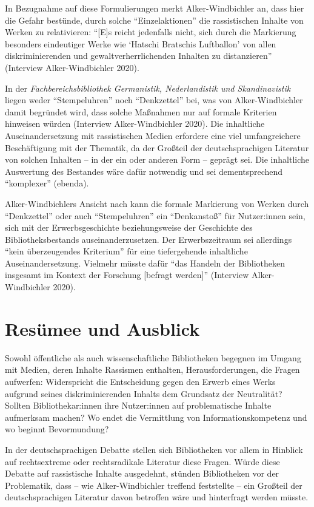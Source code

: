 \documentclass[a4paper,
fontsize=11pt,
oneside,
numbers=noperiodatend,
parskip=half-,
bibliography=totoc,
final
]{scrartcl}
\begin{document}
In Bezugnahme auf diese Formulierungen merkt Alker-Windbichler an, dass
hier die Gefahr bestünde, durch solche \enquote{Einzelaktionen} die
rassistischen Inhalte von Werken zu relativieren: \enquote{[E]s reicht
jedenfalls nicht, sich durch die Markierung besonders eindeutiger Werke
wie `Hatschi Bratschis Luftballon' von allen diskriminierenden und
gewaltverherrlichenden Inhalten zu distanzieren} (Interview
Alker-Windbichler 2020).

In der \emph{Fachbereichsbibliothek Germanistik, Nederlandistik und
Skandinavistik} liegen weder \enquote{Stempeluhren} noch \enquote{Denkzettel} bei,
was von Alker-Windbichler damit begründet wird, dass solche Maßnahmen
nur auf formale Kriterien hinweisen würden (Interview Alker-Windbichler
2020). Die inhaltliche Auseinandersetzung mit rassistischen Medien
erfordere eine viel umfangreichere Beschäftigung mit der Thematik, da
der Großteil der deutschsprachigen Literatur von solchen Inhalten -- in
der ein oder anderen Form -- geprägt sei. Die inhaltliche Auswertung des
Bestandes wäre dafür notwendig und sei dementsprechend \enquote{komplexer}
(ebenda).

Alker-Windbichlers Ansicht nach kann die formale Markierung von Werken
durch \enquote{Denkzettel} oder auch \enquote{Stempeluhren} ein \enquote{Denkanstoß} für
Nutzer:innen sein, sich mit der Erwerbsgeschichte beziehungsweise der
Geschichte des Bibliotheksbestands auseinanderzusetzen. Der
Erwerbszeitraum sei allerdings \enquote{kein überzeugendes Kriterium} für eine
tiefergehende inhaltliche Auseinandersetzung. Vielmehr müsste dafür
\enquote{das Handeln der Bibliotheken insgesamt im Kontext der Forschung
[befragt werden]} (Interview Alker-Windbichler 2020).

\hypertarget{resuxfcmee-und-ausblick}{%
\section{Resümee und Ausblick}\label{resuxfcmee-und-ausblick}}

Sowohl öffentliche als auch wissenschaftliche Bibliotheken begegnen im
Umgang mit Medien, deren Inhalte Rassismen enthalten, Herausforderungen,
die Fragen aufwerfen: Widerspricht die Entscheidung gegen den Erwerb
eines Werks aufgrund seines diskriminierenden Inhalts dem Grundsatz der
Neutralität? Sollten Bibliothekar:innen ihre Nutzer:innen auf
problematische Inhalte aufmerksam machen? Wo endet die Vermittlung von
Informationskompetenz und wo beginnt Bevormundung?

In der deutschsprachigen Debatte stellen sich Bibliotheken vor allem in
Hinblick auf rechtsextreme oder rechtsradikale Literatur diese Fragen.
Würde diese Debatte auf rassistische Inhalte ausgedehnt, stünden
Bibliotheken vor der Problematik, dass -- wie Alker-Windbichler treffend
feststellte -- ein Großteil der deutschsprachigen Literatur davon
betroffen wäre und hinterfragt werden müsste.
\end{document}
